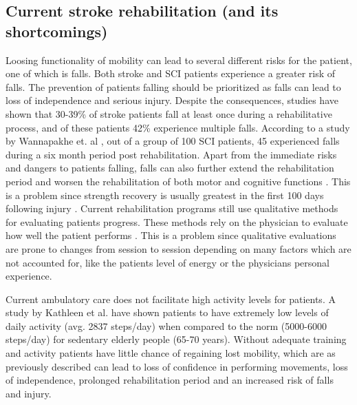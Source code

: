 
\subsection{Current stroke rehabilitation (and its shortcomings)}
Loosing functionality of mobility can lead to several different risks for the patient, one of which is falls. Both stroke and SCI patients experience a greater risk of falls. The prevention of patients falling should be prioritized as falls can lead to loss of independence and serious injury. Despite the consequences, studies have shown that 30-39\% of stroke patients fall at least once during a rehabilitative process, and of these patients 42\% experience multiple falls. \cite{Bhalla2016, Hanger2014} According to a study by Wannapakhe et. al \cite{Wannapakhe2015}, out of a group of 100 SCI patients, 45 experienced falls during a six month period post rehabilitation. 
Apart from the immediate risks and dangers to patients falling, falls can also further extend the rehabilitation period and worsen the rehabilitation of both motor and cognitive functions \cite{Wong2016, Blennerhassett2012}. This is a problem since strength recovery is usually greatest in the first 100 days following injury \cite{Weidner2017}. 
Current rehabilitation programs still use qualitative methods for evaluating patients progress. These methods rely on the physician to evaluate how well the patient performs \cite{ANPT_SCI2018, ANPT_Stroke2018}. This is a problem since qualitative evaluations are prone to changes from session to session depending on many factors which are not accounted for, like the patients level of energy or the physicians personal experience. 

 

Current ambulatory care does not facilitate high activity levels for patients. A study by Kathleen et al. \cite{Michael2005} have shown patients to have extremely low levels of daily activity (avg. 2837 steps/day) when compared to the norm (5000-6000 steps/day) for sedentary elderly people (65-70 years). Without adequate training and activity patients have little chance of regaining lost mobility, which are as previously described can lead to loss of confidence in performing movements, loss of independence, prolonged rehabilitation period and an increased risk of falls and injury. 


